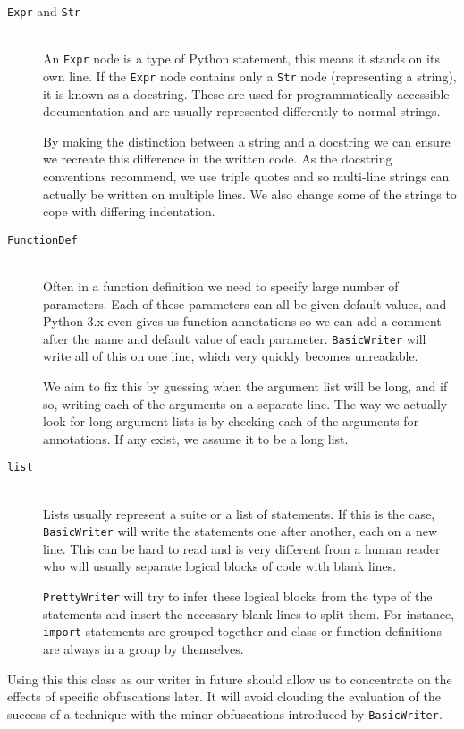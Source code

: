 \documentclass[twoside,a4paper]{report}
\begin{document}
\begin{description}
\item[\texttt{Expr} and \texttt{Str}] \hfill \\
An \texttt{Expr} node is a type of Python statement, this means it stands on its own line. If the \texttt{Expr} node contains only a \texttt{Str} node
(representing a string), it is known as a docstring. These are used for programmatically accessible documentation and are usually represented
differently to normal strings.

By making the distinction between a string and a docstring we can ensure we recreate this difference in the written code. As the docstring conventions 
\cite{docstr} recommend, we use triple quotes and so multi-line strings can actually be written on multiple lines. We also change some of the strings to
cope with differing indentation.

\item[\texttt{FunctionDef}] \hfill \\
Often in a function definition we need to specify large number of parameters. Each of these parameters can all be given default values, and Python 3.x
even gives us function annotations so we can add a comment after the name and default value of each parameter. \texttt{BasicWriter} will write all
of this on one line, which very quickly becomes unreadable.

We aim to fix this by guessing when the argument list will be long, and if so, writing each of the arguments on a separate line. The way we actually look
for long argument lists is by checking each of the arguments for annotations. If any exist, we assume it to be a long list.

\item[\texttt{list}] \hfill \\
Lists usually represent a suite or a list of statements. If this is the case, \texttt{BasicWriter} will write the statements one after another, each on a
new line. This can be hard to read and is very different from a human reader who will usually separate logical blocks of code with blank lines.

\texttt{PrettyWriter} will try to infer these logical blocks from the type of the statements and insert the necessary blank lines to split them. For instance,
\texttt{import} statements are grouped together and class or function definitions are always in a group by themselves.
\end{description}

Using this this class as our writer in future should allow us to concentrate on the effects of specific obfuscations later. It will avoid clouding the evaluation
of the success of a technique with the minor obfuscations introduced by \texttt{BasicWriter}.
\end{document}
